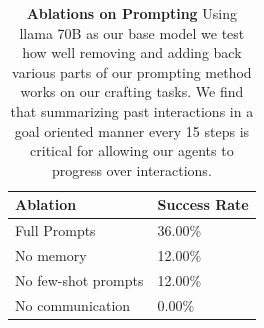 

\begin{table}[H]
\centering
\begin{tabular}{@{}ll@{}}
\toprule
Ablation & Success Rate \\ \midrule
Full Prompts      & 36.00\%  \\
No memory      & 12.00\%    \\
No few-shot prompts  &  12.00\%  \\
No communication & 0.00\% \\
\bottomrule
\end{tabular}
\caption{\textbf{Ablations on Prompting} Using llama 70B as our base model we test how well removing and adding back various parts of our prompting method works on our crafting tasks. We find that summarizing past interactions in a goal oriented manner every 15 steps is critical for allowing our agents to progress over interactions.}
\label{tab:agent-ablations}
\end{table}
